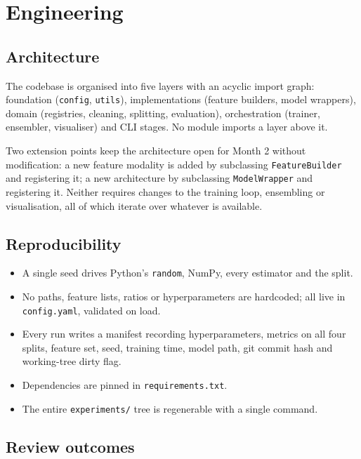 \documentclass[11pt,a4paper]{article}
\newcommand{\code}[1]{\texttt{\small #1}}
\begin{document}
\section{Engineering}

\subsection{Architecture}

The codebase is organised into five layers with an acyclic import graph:
foundation (\code{config}, \code{utils}), implementations (feature builders,
model wrappers), domain (registries, cleaning, splitting, evaluation),
orchestration (trainer, ensembler, visualiser) and CLI stages. No module imports
a layer above it.

Two extension points keep the architecture open for Month 2 without
modification: a new feature modality is added by subclassing
\code{FeatureBuilder} and registering it; a new architecture by subclassing
\code{ModelWrapper} and registering it. Neither requires changes to the training
loop, ensembling or visualisation, all of which iterate over whatever is
available.

\subsection{Reproducibility}

\begin{itemize}
  \item A single seed drives Python's \code{random}, NumPy, every estimator and
        the split.
  \item No paths, feature lists, ratios or hyperparameters are hardcoded; all
        live in \code{config.yaml}, validated on load.
  \item Every run writes a manifest recording hyperparameters, metrics on all
        four splits, feature set, seed, training time, model path, git commit
        hash and working-tree dirty flag.
  \item Dependencies are pinned in \code{requirements.txt}.
  \item The entire \code{experiments/} tree is regenerable with a single
        command.
\end{itemize}

\subsection{Review outcomes}
\end{document}

